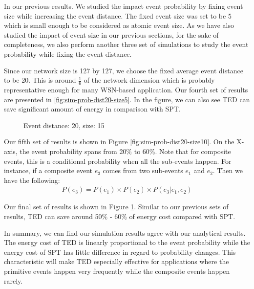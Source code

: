 In our previous results. We studied the impact event probability by fixing event size while increasing the event distance. The fixed event size was set to be 5 which is small enough to be considered as atomic event size. As we have also studied the impact of event size in our previous sections, for the sake of completeness, we also perform another three set of simulations to study the event probability while fixing the event distance.

Since our network size is 127 by 127, we choose the fixed average event distance to be 20. This is around \(\frac{1}{6}\) of the network dimension which is probably representative enough for many WSN-based application. Our fourth set of results are presented in \ref{fig:sim-prob-dist20-size5}. In the figure, we can also see TED can save significant amount of energy in comparison with SPT.

\begin{figure}
\centering
{}
\caption{Event distance: 20, size: 15}
\label{fig:sim-prob-dist20-size15}
\end{figure}

Our fifth set of results is shown in Figure \ref{fig:sim-prob-dist20-size10}. On the X-axis, the event probability spans from 20\% to 60\%. Note that for composite events, this is a conditional probability when all the sub-events happen. For instance, if a composite event \(e_3\) comes from two sub-events \(e_1\) and \(e_2\). Then we have the following:
\begin{align*}
P(e_3) = P(e_1) \times P(e_2) \times P(e_3|e_1, e_2)
\end{align*}

Our final set of results is shown in Figure \ref{fig:sim-prob-dist20-size15}. Similar to our previous sets of results, TED can save around 50\% - 60\% of energy cost compared with SPT.

In summary, we can find our simulation results agree with our analytical results. The energy cost of TED is linearly proportional to the event probability while the energy cost of SPT has little difference in regard to probability changes. This characteristic will make TED especially effective for applications where the primitive events happen very frequently while the composite events happen rarely.